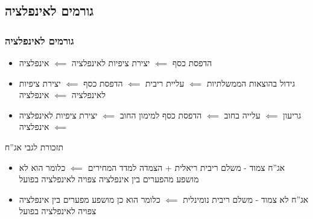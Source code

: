 \documentclass[usenames,dvipsnames]{beamer}
\begin{document}
\begin{RTL}
\section{גורמים לאינפלציה}
\begin{frame}[allowframebreaks]
    \frametitle{גורמים לאינפלציה}
    \begin{itemize}
        \item הדפסת כסף $\impliedby$ יצירת ציפיות לאינפלציה $\impliedby$ אינפלציה
        \item גידול בהוצאות הממשלתיות $\impliedby$ עליית ריבית $\impliedby$ הדפסת כסף $\impliedby$ יצירת ציפיות לאינפלציה $\impliedby$ אינפלציה
        \item גריעון $\impliedby$ עלייה בחוב $ \impliedby$ הדפסת כסף למימון החוב $\impliedby$ יצירת ציפיות לאינפלציה $\impliedby$ אינפלציה
    \end{itemize}
    
    \framebreak

    \begin{block}{תזכורת לגבי אג''ח}
        \begin{itemize}
        \item  אג''ח צמוד - משלם ריבית ריאלית + הצמדה למדד המחירים $\impliedby$ כלומר הוא לא מושפע מהפערים בין אינפלציה צפויה לאינפלציה בפועל
        \item אג''ח לא צמוד - משלם ריבית נומינלית $\impliedby$ כלומר הוא כן מושפע מפערים בין אינפלציה צפויה לאינפלציה בפועל
        \end{itemize}
        
    \end{block}

\end{frame}
\end{RTL}
\end{document}
